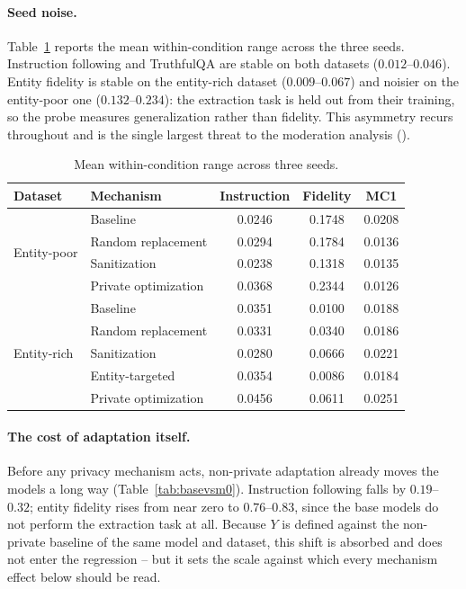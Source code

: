 \paragraph{Seed noise.}
Table~\ref{tab:seednoise} reports the mean within-condition range across the three seeds.
Instruction following and TruthfulQA are stable on both datasets ($0.012$--$0.046$).
Entity fidelity is stable on the entity-rich dataset ($0.009$--$0.067$) and noisier on the entity-poor one ($0.132$--$0.234$):
the extraction task is held out from their training,
so the probe measures generalization rather than fidelity.
This asymmetry recurs throughout and is the single largest threat to the moderation analysis ().

\begin{table}[t]
  \centering
  \caption{Mean within-condition range across three seeds.}
  \label{tab:seednoise}
  \begin{tabular}{llccc}
    \toprule
    Dataset & Mechanism & Instruction & Fidelity & MC1 \\
    \midrule
    \multirow{4}{*}{Entity-poor}
     & Baseline             & 0.0246 & 0.1748 & 0.0208 \\
     & Random replacement   & 0.0294 & 0.1784 & 0.0136 \\
     & Sanitization         & 0.0238 & 0.1318 & 0.0135 \\
     & Private optimization & 0.0368 & 0.2344 & 0.0126 \\
    \midrule
    \multirow{5}{*}{Entity-rich}
     & Baseline             & 0.0351 & 0.0100 & 0.0188 \\
     & Random replacement   & 0.0331 & 0.0340 & 0.0186 \\
     & Sanitization         & 0.0280 & 0.0666 & 0.0221 \\
     & Entity-targeted      & 0.0354 & 0.0086 & 0.0184 \\
     & Private optimization & 0.0456 & 0.0611 & 0.0251 \\
    \bottomrule
  \end{tabular}
\end{table}

\paragraph{The cost of adaptation itself.}
Before any privacy mechanism acts,
non-private adaptation already moves the models a long way (Table~\ref{tab:basevsm0}).
Instruction following falls by $0.19$--$0.32$;
entity fidelity rises from near zero to $0.76$--$0.83$,
since the base models do not perform the extraction task at all.
Because $Y$ is defined against the non-private baseline of the same model and dataset,
this shift is absorbed and does not enter the regression -- but it sets the scale against which every mechanism effect below should be read.

